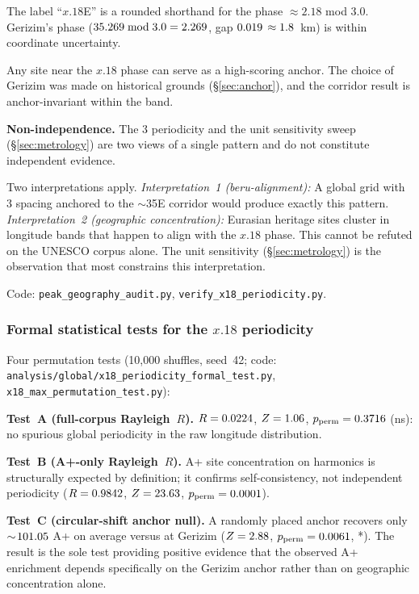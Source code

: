 \documentclass[12pt,a4paper]{article}
\begin{document}
The label ``$x.18$\textdegree{}E'' is a rounded shorthand for the phase
$\approx 2.18$\textdegree{} mod 3.0\textdegree{}.
Gerizim's phase ($35.269 \bmod 3.0 = 2.269$\textdegree{},
gap $0.019$\textdegree{} $\approx 1.8$~km) is within
coordinate uncertainty.

Any site near the $x.18$\textdegree{} phase can serve as a high-scoring
anchor. The choice of Gerizim was made on historical grounds
(\S\ref{sec:anchor}), and the corridor result is anchor-invariant
within the band.

\textbf{Non-independence.} The 3\textdegree{} periodicity and the unit
sensitivity sweep (\S\ref{sec:metrology}) are two views of a single
pattern and do not constitute independent evidence.

Two interpretations apply.
\textit{Interpretation~1 (beru-alignment):} A global grid with
3\textdegree{} spacing anchored to the $\sim$35\textdegree{}E corridor
would produce exactly this pattern.
\textit{Interpretation~2 (geographic concentration):} Eurasian heritage
sites cluster in longitude bands that happen to align with the
$x.18$\textdegree{} phase. This cannot be refuted on the UNESCO corpus
alone. The unit sensitivity (\S\ref{sec:metrology}) is the observation
that most constrains this interpretation.

Code: \texttt{peak\_geography\_audit.py}, \texttt{verify\_x18\_periodicity.py}.

\subsubsection*{Formal statistical tests for the $x.18$\textdegree{} periodicity}
\label{sec:x18_formal}

Four permutation tests (10,000 shuffles, seed~42;
code: \texttt{analysis/global/x18\_periodicity\_formal\_test.py},
\texttt{x18\_max\_permutation\_test.py}):

\textbf{Test~A (full-corpus Rayleigh~$R$).}
$R = 0.0224$, $Z = 1.06$,
$p_\mathrm{perm} = 0.3716$ (ns): no spurious global periodicity
in the raw longitude distribution.

\textbf{Test~B (A+-only Rayleigh~$R$).}
A+ site concentration on harmonics is structurally expected by definition;
it confirms self-consistency, not independent periodicity
($R = 0.9842$, $Z = 23.63$, $p_\mathrm{perm} = 0.0001$).

\textbf{Test~C (circular-shift anchor null).}
A randomly placed anchor recovers only $\sim\!101.05$ A+ on
average versus \anchorShiftApCount{} at Gerizim
($Z = 2.88$, $p_\mathrm{perm} = 0.0061$, *).
The result is the sole test providing positive evidence that the observed A+
enrichment depends specifically on the Gerizim anchor rather than on geographic
concentration alone.
\end{document}

